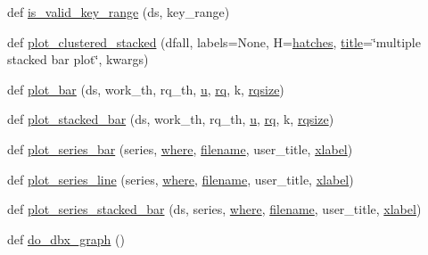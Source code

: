 \begin{DoxyCompactItemize}
\item 
def \hyperlink{namespacegraphs_a01540d61a6e4b033deadaa69f64ea1fd}{is\+\_\+valid\+\_\+key\+\_\+range} (ds, key\+\_\+range)
\item 
def \hyperlink{namespacegraphs_a35693253c342185fb0433036ca195851}{plot\+\_\+clustered\+\_\+stacked} (dfall, labels=None, H=\hyperlink{namespacegraphs_a7834f87f73120010330fe10b311d2274}{hatches}, \hyperlink{namespacegraphs_a64551207fb3a71a0f3c293a3539f14e6}{title}=\char`\"{}multiple stacked bar plot\char`\"{}, kwargs)
\item 
def \hyperlink{namespacegraphs_abb9e760790f5dff6bdc43949da546abd}{plot\+\_\+bar} (ds, work\+\_\+th, rq\+\_\+th, \hyperlink{namespacegraphs_aebc3e1c4f83749bafa0b9caba4731c50}{u}, \hyperlink{namespacegraphs_a33bf9d2e68f4dc94babb18dc33f1b61f}{rq}, k, \hyperlink{namespacegraphs_ab34652bfd8c71e2cd2bd43e4e6524525}{rqsize})
\item 
def \hyperlink{namespacegraphs_aa5bde0e5cc7ee270a041b393e894622a}{plot\+\_\+stacked\+\_\+bar} (ds, work\+\_\+th, rq\+\_\+th, \hyperlink{namespacegraphs_aebc3e1c4f83749bafa0b9caba4731c50}{u}, \hyperlink{namespacegraphs_a33bf9d2e68f4dc94babb18dc33f1b61f}{rq}, k, \hyperlink{namespacegraphs_ab34652bfd8c71e2cd2bd43e4e6524525}{rqsize})
\item 
def \hyperlink{namespacegraphs_a17811242c6ee87a679847b61f94d8404}{plot\+\_\+series\+\_\+bar} (series, \hyperlink{namespacegraphs_a3f641a99f0d63776af3f7bf756acb657}{where}, \hyperlink{namespacegraphs_add61a1e3eb0503ac58c89959c4ab20be}{filename}, user\+\_\+title, \hyperlink{namespacegraphs_a13b5142f4c941140bcf3b2caf04f39b5}{xlabel})
\item 
def \hyperlink{namespacegraphs_af558d7a2b643f747f656fd0ae50a243b}{plot\+\_\+series\+\_\+line} (series, \hyperlink{namespacegraphs_a3f641a99f0d63776af3f7bf756acb657}{where}, \hyperlink{namespacegraphs_add61a1e3eb0503ac58c89959c4ab20be}{filename}, user\+\_\+title, \hyperlink{namespacegraphs_a13b5142f4c941140bcf3b2caf04f39b5}{xlabel})
\item 
def \hyperlink{namespacegraphs_a727b6df37fad8bf4be3fa2d9691c47b3}{plot\+\_\+series\+\_\+stacked\+\_\+bar} (ds, series, \hyperlink{namespacegraphs_a3f641a99f0d63776af3f7bf756acb657}{where}, \hyperlink{namespacegraphs_add61a1e3eb0503ac58c89959c4ab20be}{filename}, user\+\_\+title, \hyperlink{namespacegraphs_a13b5142f4c941140bcf3b2caf04f39b5}{xlabel})
\item 
def \hyperlink{namespacegraphs_a2763f70f297c96908aa5a0a1c5807da4}{do\+\_\+dbx\+\_\+graph} ()
\end{DoxyCompactItemize}
